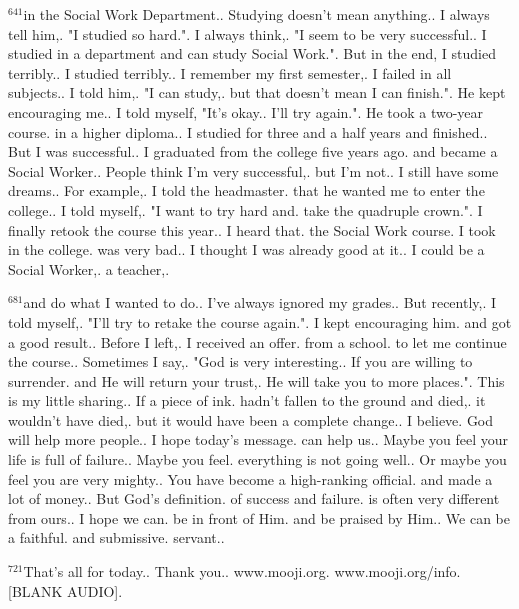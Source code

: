 \documentclass{book}
\begin{document}
$^{641}$in the Social Work Department..
Studying doesn't mean anything..
I always tell him,.
"I studied so hard.".
I always think,.
"I seem to be very successful..
I studied in a department and can study Social Work.".
But in the end, I studied terribly..
I studied terribly..
I remember my first semester,.
I failed in all subjects..
I told him,.
"I can study,.
but that doesn't mean I can finish.".
He kept encouraging me..
I told myself, "It's okay..
I'll try again.".
He took a two-year course.
in a higher diploma..
I studied for three and a half years and finished..
But I was successful..
I graduated from the college five years ago.
and became a Social Worker..
People think I'm very successful,.
but I'm not..
I still have some dreams..
For example,.
I told the headmaster.
that he wanted me to enter the college..
I told myself,.
"I want to try hard and.
take the quadruple crown.".
I finally retook the course this year..
I heard that.
the Social Work course.
I took in the college.
was very bad..
I thought I was already good at it..
I could be a Social Worker,.
a teacher,.

$^{681}$and do what I wanted to do..
I've always ignored my grades..
But recently,.
I told myself,.
"I'll try to retake the course again.".
I kept encouraging him.
and got a good result..
Before I left,.
I received an offer.
from a school.
to let me continue the course..
Sometimes I say,.
"God is very interesting..
If you are willing to surrender.
and He will return your trust,.
He will take you to more places.".
This is my little sharing..
If a piece of ink.
hadn't fallen to the ground and died,.
it wouldn't have died,.
but it would have been a complete change..
I believe.
God will help more people..
I hope today's message.
can help us..
Maybe you feel your life is full of failure..
Maybe you feel.
everything is not going well..
Or maybe you feel you are very mighty..
You have become a high-ranking official.
and made a lot of money..
But God's definition.
of success and failure.
is often very different from ours..
I hope we can.
be in front of Him.
and be praised by Him..
We can be a faithful.
and submissive.
servant..

$^{721}$That's all for today..
Thank you..
www.mooji.org.
www.mooji.org/info.
[BLANK AUDIO].
\newpage
\end{document}
